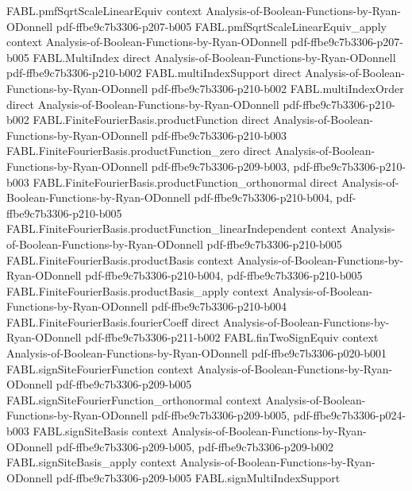 \begin{theorem}
\proofstep
  {FABL.pmfSqrtScaleLinearEquiv}
  {context}
  {Analysis-of-Boolean-Functions-by-Ryan-ODonnell}
  {pdf-ffbe9c7b3306-p207-b005}
\proofstep
  {FABL.pmfSqrtScaleLinearEquiv_apply}
  {context}
  {Analysis-of-Boolean-Functions-by-Ryan-ODonnell}
  {pdf-ffbe9c7b3306-p207-b005}
\proofstep
  {FABL.MultiIndex}
  {direct}
  {Analysis-of-Boolean-Functions-by-Ryan-ODonnell}
  {pdf-ffbe9c7b3306-p210-b002}
\proofstep
  {FABL.multiIndexSupport}
  {direct}
  {Analysis-of-Boolean-Functions-by-Ryan-ODonnell}
  {pdf-ffbe9c7b3306-p210-b002}
\proofstep
  {FABL.multiIndexOrder}
  {direct}
  {Analysis-of-Boolean-Functions-by-Ryan-ODonnell}
  {pdf-ffbe9c7b3306-p210-b002}
\proofstep
  {FABL.FiniteFourierBasis.productFunction}
  {direct}
  {Analysis-of-Boolean-Functions-by-Ryan-ODonnell}
  {pdf-ffbe9c7b3306-p210-b003}
\proofstep
  {FABL.FiniteFourierBasis.productFunction_zero}
  {direct}
  {Analysis-of-Boolean-Functions-by-Ryan-ODonnell}
  {pdf-ffbe9c7b3306-p209-b003,
    pdf-ffbe9c7b3306-p210-b003}
\proofstep
  {FABL.FiniteFourierBasis.productFunction_orthonormal}
  {direct}
  {Analysis-of-Boolean-Functions-by-Ryan-ODonnell}
  {pdf-ffbe9c7b3306-p210-b004,
    pdf-ffbe9c7b3306-p210-b005}
\proofstep
  {FABL.FiniteFourierBasis.productFunction_linearIndependent}
  {context}
  {Analysis-of-Boolean-Functions-by-Ryan-ODonnell}
  {pdf-ffbe9c7b3306-p210-b005}
\proofstep
  {FABL.FiniteFourierBasis.productBasis}
  {context}
  {Analysis-of-Boolean-Functions-by-Ryan-ODonnell}
  {pdf-ffbe9c7b3306-p210-b004,
    pdf-ffbe9c7b3306-p210-b005}
\proofstep
  {FABL.FiniteFourierBasis.productBasis_apply}
  {context}
  {Analysis-of-Boolean-Functions-by-Ryan-ODonnell}
  {pdf-ffbe9c7b3306-p210-b004}
\proofstep
  {FABL.FiniteFourierBasis.fourierCoeff}
  {direct}
  {Analysis-of-Boolean-Functions-by-Ryan-ODonnell}
  {pdf-ffbe9c7b3306-p211-b002}
\proofstep
  {FABL.finTwoSignEquiv}
  {context}
  {Analysis-of-Boolean-Functions-by-Ryan-ODonnell}
  {pdf-ffbe9c7b3306-p020-b001}
\proofstep
  {FABL.signSiteFourierFunction}
  {context}
  {Analysis-of-Boolean-Functions-by-Ryan-ODonnell}
  {pdf-ffbe9c7b3306-p209-b005}
\proofstep
  {FABL.signSiteFourierFunction_orthonormal}
  {context}
  {Analysis-of-Boolean-Functions-by-Ryan-ODonnell}
  {pdf-ffbe9c7b3306-p209-b005,
    pdf-ffbe9c7b3306-p024-b003}
\proofstep
  {FABL.signSiteBasis}
  {context}
  {Analysis-of-Boolean-Functions-by-Ryan-ODonnell}
  {pdf-ffbe9c7b3306-p209-b005,
    pdf-ffbe9c7b3306-p209-b002}
\proofstep
  {FABL.signSiteBasis_apply}
  {context}
  {Analysis-of-Boolean-Functions-by-Ryan-ODonnell}
  {pdf-ffbe9c7b3306-p209-b005}
\proofstep
  {FABL.signMultiIndexSupport}

\end{theorem}

